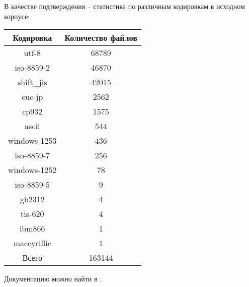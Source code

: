 В качестве подтверждения -- статистика по различным кодировкам в исходном корпусе:

\begin{tabular}{|c|c|} \hline
Кодировка & Количество файлов \\ \hline 
utf-8 & 68789\\ 
iso-8859-2 & 46870\\ 
shift\_jis & 42015\\ 
euc-jp & 2562\\ 
cp932 & 1575\\ 
ascii & 544\\ 
windows-1253 & 436\\ 
iso-8859-7 & 256\\ 
windows-1252 & 78\\ 
iso-8859-5 & 9\\ 
gb2312 & 4\\ 
tis-620 & 4\\ 
ibm866 & 1\\ 
maccyrillic & 1\\ \hline
Всего & 163144 \\ \hline
\end{tabular}

Документацию можно найти в \cite{python:dammit}.

%
%

